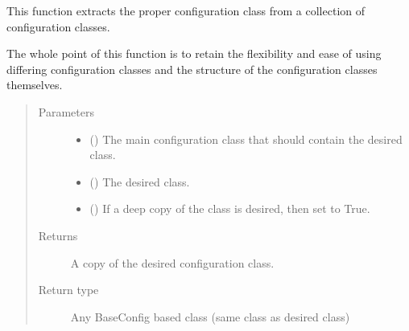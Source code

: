 \documentclass[letterpaper,10pt,english]{sphinxmanual}
\begin{document}
\begin{fulllineitems}
\label{\detokenize{python_docstrings/IfA_Smeargle.meta.configuration:IfA_Smeargle.meta.configuration.extract_proper_configuration_class}}
This function extracts the proper configuration class from a
collection of configuration classes.

The whole point of this function is to retain the flexibility and ease
of using differing configuration classes and the structure of the
configuration classes themselves.
\begin{quote}\begin{description}
\item[{Parameters}] \leavevmode\begin{itemize}
\item {} 
 () \textendash{} The main configuration class that should contain the desired class.

\item {} 
 () \textendash{} The desired class.

\item {} 
 (\sphinxstyleliteralemphasis{\sphinxupquote{ (}}\sphinxstyleliteralemphasis{\sphinxupquote{)}}) \textendash{} If a deep copy of the class is desired, then set to True.

\end{itemize}

\item[{Returns}] \leavevmode
{} \textendash{} A copy of the desired configuration class.

\item[{Return type}] \leavevmode
Any BaseConfig based class (same class as desired class)

\end{description}\end{quote}

\end{fulllineitems}
\end{document}
